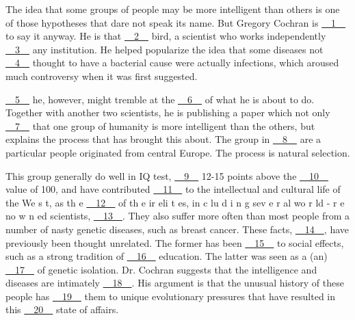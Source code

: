 The idea that some groups of people may be more intelligent than others is one of those hypotheses that dare not speak its name. But Gregory Cochran is \uline{~~1~~} to say it anyway. He is that \uline{~~2~~} bird, a scientist who works independently \uline{~~3~~} any institution. He helped popularize the idea that some diseases not \uline{~~4~~} thought to have a bacterial cause were actually infections, which aroused much controversy when it was first suggested.


\uline{~~5~~} he, however, might tremble at the \uline{~~6~~} of what he is about to do. Together with another two scientists, he is publishing a paper which not only \uline{~~7~~} that one  group of humanity is more intelligent than the others, but explains the process that has brought this about. The group in \uline{~~8~~} are a particular people originated from  central Europe. The process is natural selection.


This group generally do well in IQ test, \uline{~~9~~} 12-15 points above the \uline{~~10~~} value of 100, and have contributed \uline{~~11~~} to the intellectual and cultural life of the  We s t, as th e \uline{~~12~~} of th e ir eli t es, in c lu d i n g sev e r al wo r ld - r e no w n ed scientists, \uline{~~13~~}. They also suffer more often than most people from a number of nasty genetic diseases, such as breast cancer. These facts, \uline{~~14~~}, have previously been thought unrelated. The former has been \uline{~~15~~} to social effects,   such as a strong tradition of \uline{~~16~~} education. The latter was seen as a (an) \uline{~~17~~} of genetic isolation. Dr. Cochran suggests that the intelligence and diseases are intimately \uline{~~18~~}.  His argument is that the unusual history of  these people  has \uline{~~19~~} them  to  unique  evolutionary  pressures  that  have  resulted  in this \uline{~~20~~} state of affairs.